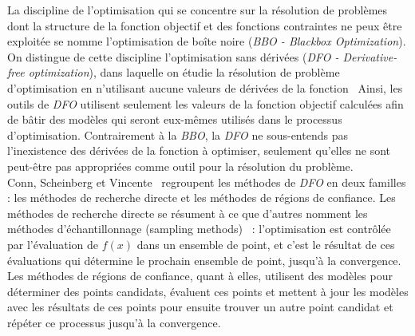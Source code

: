 La discipline de l'optimisation qui se concentre sur la résolution de problèmes dont la structure de la fonction objectif et des fonctions contraintes ne peux être exploitée se nomme l'optimisation de boîte noire (\textit{BBO - Blackbox Optimization}). On distingue de cette discipline l'optimisation sans dérivées (\textit{DFO -  Derivative-free optimization}), dans laquelle on étudie la résolution de problème d'optimisation en n'utilisant aucune valeurs de dérivées de la fonction~\cite{AuHa2018,AuKok2016} Ainsi, les outils de \textit{DFO} utilisent seulement les valeurs de la fonction objectif calculées afin de bâtir des modèles qui seront eux-mêmes utilisés dans le processus d'optimisation. Contrairement à la \textit{BBO}, la \textit{DFO}  ne sous-entends pas l'inexistence des dérivées de la fonction à optimiser, seulement qu'elles ne sont peut-être pas appropriées comme outil pour la résolution du problème.\\
Conn, Scheinberg et Vincente~\cite{CoScVibook} regroupent les méthodes de \textit{DFO}  en deux familles :  les méthodes de recherche directe et les méthodes de régions de confiance. Les méthodes de recherche directe se résument à ce que d'autres nomment les méthodes d'échantillonnage (sampling methods)~\cite{Kelley2011} : l'optimisation est contrôlée par l'évaluation de $f(x)$ dans un ensemble de point, et c'est le résultat de ces évaluations qui détermine le prochain ensemble de point, jusqu'à la convergence. Les méthodes de régions de confiance, quant à elles, utilisent des modèles pour déterminer des points candidats, évaluent ces points et mettent à jour les modèles avec les résultats de ces points pour ensuite trouver un autre point candidat et répéter ce processus jusqu'à la convergence.
